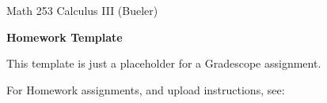 \documentclass[12pt]{amsart}
\begin{document}
\scriptsize \noindent Math 253 Calculus III (Bueler)
\normalsize\medskip

\Large\centerline{\textbf{Homework Template}}
\large
\bigskip \bigskip

\normalsize
This template is just a placeholder for a Gradescope assignment.

\bigskip
For Homework assignments, and upload instructions, see:

\begin{center}
\Large
{}
\end{center}
\end{document}
